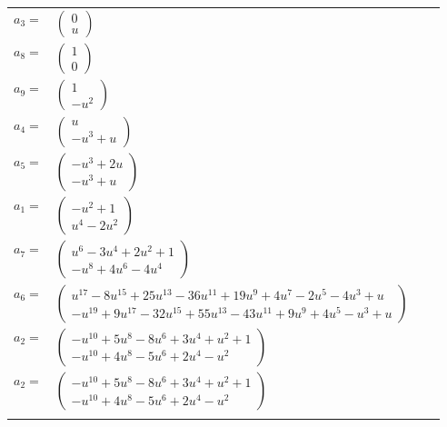 \documentclass[1p]{elsarticle_modified}
\theoremstyle{definition}
\begin{document}
\begin{tabular}{m{7pt} m{180pt} m{7pt} m{180pt} }
\flushright $a_{3}=$&$\begin{pmatrix}0\\u\end{pmatrix}$ \\
\flushright $a_{8}=$&$\begin{pmatrix}1\\0\end{pmatrix}$ \\
\flushright $a_{9}=$&$\begin{pmatrix}1\\- u^2\end{pmatrix}$ \\
\flushright $a_{4}=$&$\begin{pmatrix}u\\- u^3+u\end{pmatrix}$ \\
\flushright $a_{5}=$&$\begin{pmatrix}- u^3+2 u\\- u^3+u\end{pmatrix}$ \\
\flushright $a_{1}=$&$\begin{pmatrix}- u^2+1\\u^4-2 u^2\end{pmatrix}$ \\
\flushright $a_{7}=$&$\begin{pmatrix}u^6-3 u^4+2 u^2+1\\- u^8+4 u^6-4 u^4\end{pmatrix}$ \\
\flushright $a_{6}=$&$\begin{pmatrix}u^{17}-8 u^{15}+25 u^{13}-36 u^{11}+19 u^9+4 u^7-2 u^5-4 u^3+u\\- u^{19}+9 u^{17}-32 u^{15}+55 u^{13}-43 u^{11}+9 u^9+4 u^5- u^3+u\end{pmatrix}$ \\
\flushright $a_{2}=$&$\begin{pmatrix}- u^{10}+5 u^8-8 u^6+3 u^4+u^2+1\\- u^{10}+4 u^8-5 u^6+2 u^4- u^2\end{pmatrix}$\\ \flushright $a_{2}=$&$\begin{pmatrix}- u^{10}+5 u^8-8 u^6+3 u^4+u^2+1\\- u^{10}+4 u^8-5 u^6+2 u^4- u^2\end{pmatrix}$\\&\end{tabular}
\end{document}
